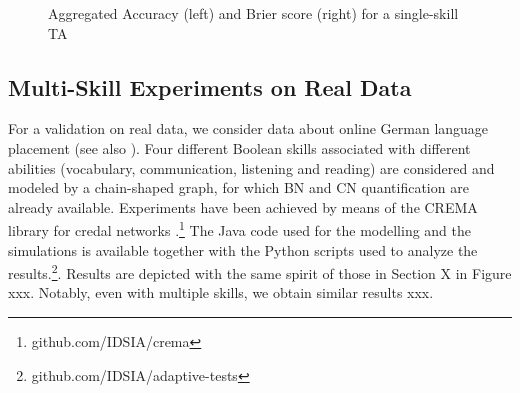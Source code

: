 \documentclass[runningheads]{llncs}
\begin{document}

\begin{figure}[htp!]
\centering


\caption{Aggregated Accuracy (left) and Brier score (right) for a single-skill TA}
\label{fig:mono}
\end{figure}
\subsection{Multi-Skill Experiments on Real Data}
For a validation on real data, we consider data about online German language placement (see also \cite{mangili2017b}). Four different Boolean skills associated with different abilities (vocabulary, communication, listening and reading) are considered and modeled by a chain-shaped graph, for which BN and CN quantification are already available. Experiments have been achieved by means of the CREMA library for credal networks \cite{huber2020a}.\footnote{github.com/IDSIA/crema} The Java code used for the modelling and the simulations is available together with the Python scripts used to analyze the results.\footnote{github.com/IDSIA/adaptive-tests}. Results are depicted with the same spirit of those in Section X in Figure xxx. Notably, even with multiple skills, we obtain similar results xxx. 
\end{document}
